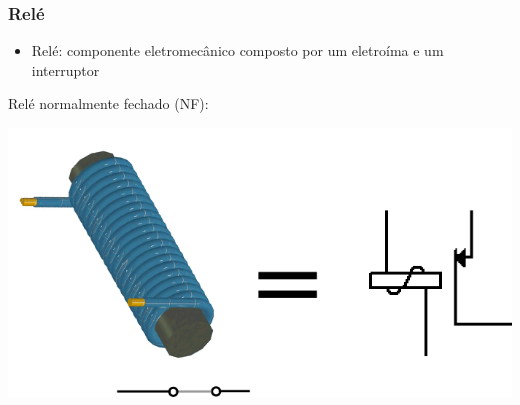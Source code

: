\documentclass{beamer}
\begin{document}
\begin{frame}
{}

\end{frame}

\begin{frame}
\frametitle{Relé}

\begin{itemize}
\item Relé: componente eletromecânico composto por um eletroíma e um interruptor
\end{itemize}

Relé normalmente fechado (NF):

\centering%
\includegraphics{images/magneto5.png}%

\end{frame}
\end{document}
